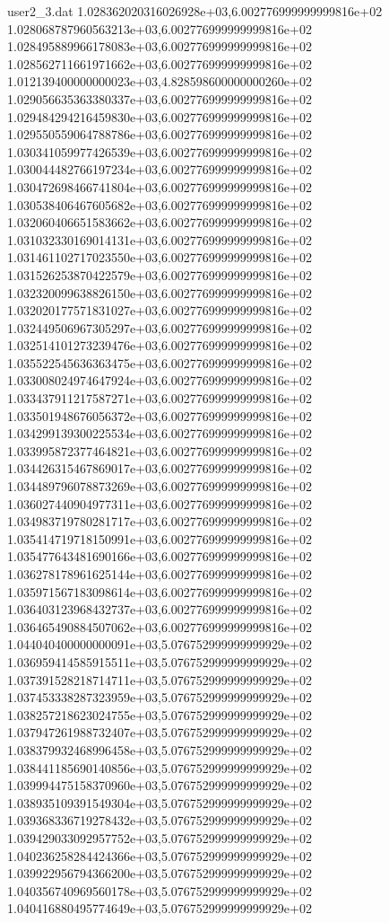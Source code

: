 \begin{filecontents}{user2_3.dat}
1.028362020316026928e+03,6.002776999999999816e+02
1.028068787960563213e+03,6.002776999999999816e+02
1.028495889966178083e+03,6.002776999999999816e+02
1.028562711661971662e+03,6.002776999999999816e+02
1.012139400000000023e+03,4.828598600000000260e+02
1.029056635363380337e+03,6.002776999999999816e+02
1.029484294216459830e+03,6.002776999999999816e+02
1.029550559064788786e+03,6.002776999999999816e+02
1.030341059977426539e+03,6.002776999999999816e+02
1.030044482766197234e+03,6.002776999999999816e+02
1.030472698466741804e+03,6.002776999999999816e+02
1.030538406467605682e+03,6.002776999999999816e+02
1.032060406651583662e+03,6.002776999999999816e+02
1.031032330169014131e+03,6.002776999999999816e+02
1.031461102717023550e+03,6.002776999999999816e+02
1.031526253870422579e+03,6.002776999999999816e+02
1.032320099638826150e+03,6.002776999999999816e+02
1.032020177571831027e+03,6.002776999999999816e+02
1.032449506967305297e+03,6.002776999999999816e+02
1.032514101273239476e+03,6.002776999999999816e+02
1.035522545636363475e+03,6.002776999999999816e+02
1.033008024974647924e+03,6.002776999999999816e+02
1.033437911217587271e+03,6.002776999999999816e+02
1.033501948676056372e+03,6.002776999999999816e+02
1.034299139300225534e+03,6.002776999999999816e+02
1.033995872377464821e+03,6.002776999999999816e+02
1.034426315467869017e+03,6.002776999999999816e+02
1.034489796078873269e+03,6.002776999999999816e+02
1.036027440904977311e+03,6.002776999999999816e+02
1.034983719780281717e+03,6.002776999999999816e+02
1.035414719718150991e+03,6.002776999999999816e+02
1.035477643481690166e+03,6.002776999999999816e+02
1.036278178961625144e+03,6.002776999999999816e+02
1.035971567183098614e+03,6.002776999999999816e+02
1.036403123968432737e+03,6.002776999999999816e+02
1.036465490884507062e+03,6.002776999999999816e+02
1.044040400000000091e+03,5.076752999999999929e+02
1.036959414585915511e+03,5.076752999999999929e+02
1.037391528218714711e+03,5.076752999999999929e+02
1.037453338287323959e+03,5.076752999999999929e+02
1.038257218623024755e+03,5.076752999999999929e+02
1.037947261988732407e+03,5.076752999999999929e+02
1.038379932468996458e+03,5.076752999999999929e+02
1.038441185690140856e+03,5.076752999999999929e+02
1.039994475158370960e+03,5.076752999999999929e+02
1.038935109391549304e+03,5.076752999999999929e+02
1.039368336719278432e+03,5.076752999999999929e+02
1.039429033092957752e+03,5.076752999999999929e+02
1.040236258284424366e+03,5.076752999999999929e+02
1.039922956794366200e+03,5.076752999999999929e+02
1.040356740969560178e+03,5.076752999999999929e+02
1.040416880495774649e+03,5.076752999999999929e+02

\end{filecontents}
